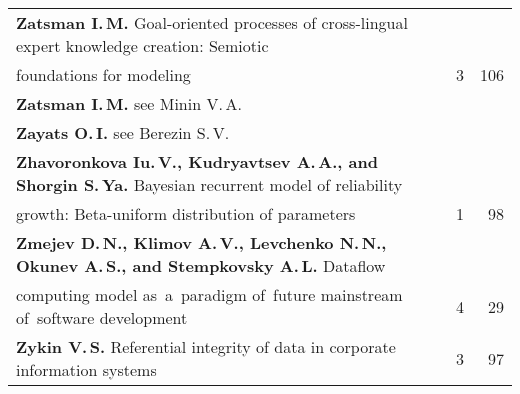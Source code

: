 {\begin{tabular}{p{397pt}rr}
\textbf{Zatsman I.\,M.} Goal-oriented processes of cross-lingual expert
knowledge creation: Semiotic\linebreak
\\[-12pt]
\hspace*{21pt}foundations for modeling&3&106\\
\textbf{Zatsman I.\,M.} see Minin V.\,A.&&\\
\textbf{Zayats O.\,I.} see Berezin S.\,V.&&\\
\textbf{Zhavoronkova Iu.\,V., Kudryavtsev A.\,A., and Shorgin S.\,Ya.}
Bayesian recurrent model of reliability\linebreak
\\[-12pt]
\hspace*{21pt}growth: Beta-uniform distribution of
parameters&1&98\\
\textbf{Zmejev D.\,N., Klimov A.\,V., Levchenko N.\,N., Okunev A.\,S., and
Stempkovsky A.\,L.} Dataflow\linebreak
\\[-12pt]
\hspace*{21pt}computing model as~a~paradigm of~future mainstream
of~software development&4&29\\
\textbf{Zykin V.\,S.} Referential integrity of data in corporate information
systems&3&97\\
\end{tabular}
}

\def\leftfootline{\small{\textbf{\thepage}
\hfill INFORMATIKA I EE PRIMENENIYA~--- INFORMATICS AND APPLICATIONS\ \ \ 2015\
\ \ volume~9\ \ \ issue\ 4}
}%
 \def\rightfootline{\small{INFORMATIKA I EE PRIMENENIYA~---
INFORMATICS AND APPLICATIONS\ \ \ 2015\ \ \ volume~9\ \ \ issue\ 4
\hfill \textbf{\thepage}}}

 \label{end\stat}

\newpage